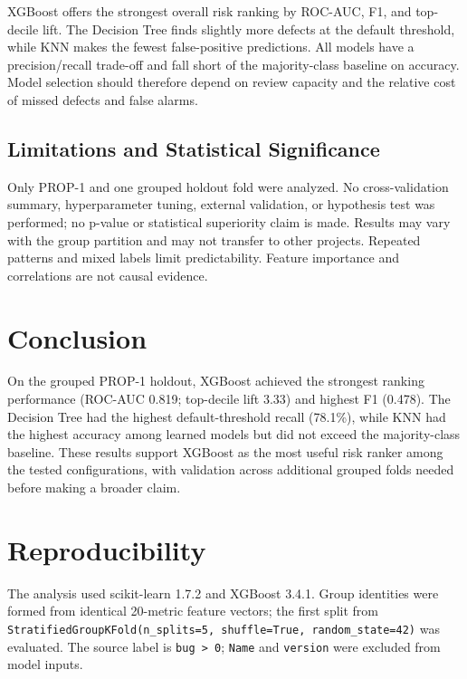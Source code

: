 \documentclass[conference]{IEEEtran}
\begin{document}
XGBoost offers the strongest overall risk ranking by ROC-AUC, F1, and top-decile lift. The Decision Tree finds slightly more defects at the default threshold, while KNN makes the fewest false-positive predictions. All models have a precision/recall trade-off and fall short of the majority-class baseline on accuracy. Model selection should therefore depend on review capacity and the relative cost of missed defects and false alarms.

\subsection{Limitations and Statistical Significance}
Only PROP-1 and one grouped holdout fold were analyzed. No cross-validation summary, hyperparameter tuning, external validation, or hypothesis test was performed; no p-value or statistical superiority claim is made. Results may vary with the group partition and may not transfer to other projects. Repeated patterns and mixed labels limit predictability. Feature importance and correlations are not causal evidence.

\section{Conclusion}
On the grouped PROP-1 holdout, XGBoost achieved the strongest ranking performance (ROC-AUC 0.819; top-decile lift 3.33) and highest F1 (0.478). The Decision Tree had the highest default-threshold recall (78.1\%), while KNN had the highest accuracy among learned models but did not exceed the majority-class baseline. These results support XGBoost as the most useful risk ranker among the tested configurations, with validation across additional grouped folds needed before making a broader claim.

\section*{Reproducibility}
The analysis used scikit-learn 1.7.2 and XGBoost 3.4.1. Group identities were formed from identical 20-metric feature vectors; the first split from \texttt{StratifiedGroupKFold(n\_splits=5, shuffle=True, random\_state=42)} was evaluated. The source label is \texttt{bug > 0}; \texttt{Name} and \texttt{version} were excluded from model inputs.



\end{document}
